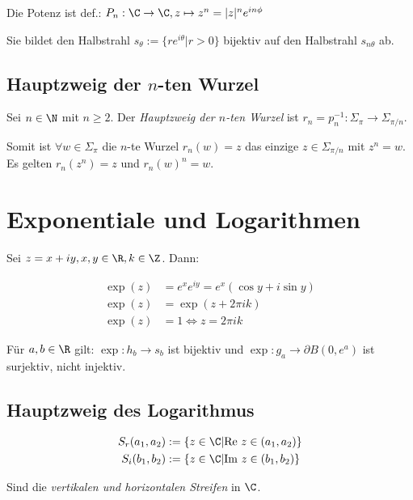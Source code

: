\vspace*{2mm}

Die Potenz ist def.: \(P_n : \C \to \C, z \mapsto z^n = |z|^n e^{in\phi}\)

Sie bildet den Halbstrahl \(s_\theta := \{ re^{i\theta} | r > 0 \}\) bijektiv auf den Halbstrahl \(s_{n\theta}\) ab.

\subsection*{Hauptzweig der \(n\)-ten Wurzel}

Sei \(n \in \N\) mit \(n \geq 2\). Der \emph{Hauptzweig der \(n\)-ten Wurzel} ist \(r_n = p_n^{-1} : \Sigma_\pi \to \Sigma_{\pi/n}\).

Somit ist \(\forall w \in \Sigma_\pi\) die \(n\)-te Wurzel \(r_n(w) = z\) das einzige \(z \in \Sigma_{\pi/n}\) mit \(z^n = w\). Es gelten \(r_n(z^n) = z\) und \(r_n(w)^n = w\).

\section*{Exponentiale und Logarithmen}

Sei \(z = x + iy, x, y \in \R, k \in \Z\). Dann:

\vspace*{-4mm}
\begin{align*}
	\exp(z) &= e^x e^{iy} = e^x(\cos y + i \sin y) \\
	\exp(z) &= \exp(z+2\pi ik) \\
	\exp(z) &= 1 \iff z=2\pi i k
\end{align*}

Für \(a, b \in \R\) gilt: \(\exp : h_b \to s_b\) ist bijektiv und \(\exp : g_a \to \partial B(0,e^a)\) ist surjektiv, nicht injektiv.

\subsection*{Hauptzweig des Logarithmus}

\vspace*{-4mm}
\begin{align*}
	S_r(a_1,a_2) &:= \{ z \in \C | \text{Re } z \in (a_1,a_2) \} \\
	S_i(b_1,b_2) &:= \{ z \in \C | \text{Im } z \in (b_1,b_2) \}
\end{align*}
\vspace*{-6mm}

Sind die \emph{vertikalen und horizontalen Streifen} in \(\C\).

